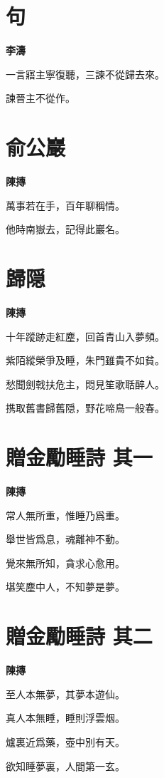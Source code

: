 \documentclass[12pt,a4paper]{ctexbook}
\begin{document}
\section{句}
\textbf{李濤}\par\vspace{0.5em}
一言寤主寧復聽，三諫不從歸去來。\par
諫晉主不從作。\par

\section{俞公巖}
\textbf{陳摶}\par\vspace{0.5em}
萬事若在手，百年聊稱情。\par
他時南嶽去，記得此巖名。\par

\section{歸隠}
\textbf{陳摶}\par\vspace{0.5em}
十年蹤跡走紅塵，回首青山入夢頻。\par
紫陌縱榮爭及睡，朱門雖貴不如貧。\par
愁聞劍戟扶危主，悶見笙歌聒醉人。\par
携取舊書歸舊隠，野花啼鳥一般春。\par

\section{贈金勵睡詩  其一}
\textbf{陳摶}\par\vspace{0.5em}
常人無所重，惟睡乃爲重。\par
舉世皆爲息，魂離神不動。\par
覺來無所知，貪求心愈用。\par
堪笑塵中人，不知夢是夢。\par

\section{贈金勵睡詩  其二}
\textbf{陳摶}\par\vspace{0.5em}
至人本無夢，其夢本遊仙。\par
真人本無睡，睡則浮雲烟。\par
爐裏近爲藥，壺中別有天。\par
欲知睡夢裏，人間第一玄。\par
\end{document}
